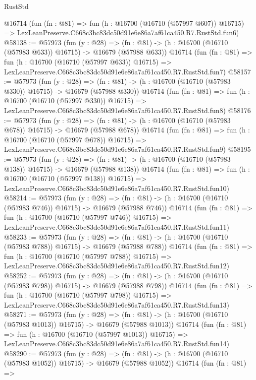 \begin{lexlean}{RustStd}
\begin{coremodule}
    @16714
    (fun (fn : @81) =>
    fun (h : @16700 (@16710 (@57997 @607)) @16715) =>
    LexLeanPreserve.C668c3bc83dc50d91e6e86a7af61ca450.R7.RustStd.fun6)
@58138 := @57973
    (fun (y : @28) =>
    (fn : @81) -> (h : @16700 (@16710 (@57983 @633)) @16715) -> @16679 (@57988 @633))
    @16714
    (fun (fn : @81) =>
    fun (h : @16700 (@16710 (@57997 @633)) @16715) =>
    LexLeanPreserve.C668c3bc83dc50d91e6e86a7af61ca450.R7.RustStd.fun7)
@58157 := @57973
    (fun (y : @28) =>
    (fn : @81) -> (h : @16700 (@16710 (@57983 @330)) @16715) -> @16679 (@57988 @330))
    @16714
    (fun (fn : @81) =>
    fun (h : @16700 (@16710 (@57997 @330)) @16715) =>
    LexLeanPreserve.C668c3bc83dc50d91e6e86a7af61ca450.R7.RustStd.fun8)
@58176 := @57973
    (fun (y : @28) =>
    (fn : @81) -> (h : @16700 (@16710 (@57983 @678)) @16715) -> @16679 (@57988 @678))
    @16714
    (fun (fn : @81) =>
    fun (h : @16700 (@16710 (@57997 @678)) @16715) =>
    LexLeanPreserve.C668c3bc83dc50d91e6e86a7af61ca450.R7.RustStd.fun9)
@58195 := @57973
    (fun (y : @28) =>
    (fn : @81) -> (h : @16700 (@16710 (@57983 @138)) @16715) -> @16679 (@57988 @138))
    @16714
    (fun (fn : @81) =>
    fun (h : @16700 (@16710 (@57997 @138)) @16715) =>
    LexLeanPreserve.C668c3bc83dc50d91e6e86a7af61ca450.R7.RustStd.fun10)
@58214 := @57973
    (fun (y : @28) =>
    (fn : @81) -> (h : @16700 (@16710 (@57983 @746)) @16715) -> @16679 (@57988 @746))
    @16714
    (fun (fn : @81) =>
    fun (h : @16700 (@16710 (@57997 @746)) @16715) =>
    LexLeanPreserve.C668c3bc83dc50d91e6e86a7af61ca450.R7.RustStd.fun11)
@58233 := @57973
    (fun (y : @28) =>
    (fn : @81) -> (h : @16700 (@16710 (@57983 @788)) @16715) -> @16679 (@57988 @788))
    @16714
    (fun (fn : @81) =>
    fun (h : @16700 (@16710 (@57997 @788)) @16715) =>
    LexLeanPreserve.C668c3bc83dc50d91e6e86a7af61ca450.R7.RustStd.fun12)
@58252 := @57973
    (fun (y : @28) =>
    (fn : @81) -> (h : @16700 (@16710 (@57983 @798)) @16715) -> @16679 (@57988 @798))
    @16714
    (fun (fn : @81) =>
    fun (h : @16700 (@16710 (@57997 @798)) @16715) =>
    LexLeanPreserve.C668c3bc83dc50d91e6e86a7af61ca450.R7.RustStd.fun13)
@58271 := @57973
    (fun (y : @28) =>
    (fn : @81) -> (h : @16700 (@16710 (@57983 @1013)) @16715) -> @16679 (@57988 @1013))
    @16714
    (fun (fn : @81) =>
    fun (h : @16700 (@16710 (@57997 @1013)) @16715) =>
    LexLeanPreserve.C668c3bc83dc50d91e6e86a7af61ca450.R7.RustStd.fun14)
@58290 := @57973
    (fun (y : @28) =>
    (fn : @81) -> (h : @16700 (@16710 (@57983 @1052)) @16715) -> @16679 (@57988 @1052))
    @16714
    (fun (fn : @81) =>

\end{coremodule}
\end{lexlean}
